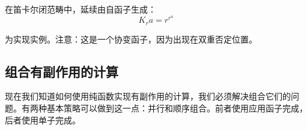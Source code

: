 \documentclass[DaoFP]{subfiles}
\begin{document}
在笛卡尔闭范畴中，延续由自函子生成：
\[ K_r a = r^{r^a} \]

\begin{exercise}
为实现实例。注意：这是一个协变函子，因为出现在双重否定位置。
\end{exercise}

\subsection{组合有副作用的计算}

现在我们知道如何使用纯函数实现有副作用的计算，我们必须解决组合它们的问题。有两种基本策略可以做到这一点：并行和顺序组合。前者使用应用函子完成，后者使用单子完成。
\end{document}
